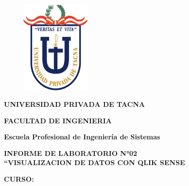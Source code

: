 \documentclass[12pt,letterpaper]{article}
\begin{document}
    \begin{titlepage}
        \begin{center}
            \begin{figure}[htb]
                \begin{center}
                    \includegraphics[width=3.5cm]{./img/logo}
                \end{center}
            \end{figure}
            \vspace*{0.15in}
            \begin{Large}
                \textbf{UNIVERSIDAD PRIVADA DE TACNA}\\
            \end{Large}
            \vspace*{0.15in}
            \begin{Large}
                \textbf{FACULTAD DE INGENIERIA} \\
            \end{Large}
            \vspace*{0.1in}
            \begin{Large}
                \textbf{Escuela Profesional de Ingeniería de Sistemas} \\
            \end{Large}
            \vspace*{0.3in}
            \begin{Large}
                \textbf{INFORME DE LABORATORIO N°02}\\
                \textbf{“VISUALIZACION DE DATOS CON QLIK SENSE}\\
            \end{Large}
            \vspace*{0.2in}
            \begin{Large}
                \textbf{CURSO:} \\
            \end{Large}
            \vspace*{0.1in}
            \begin{large}

\end{large}
\end{center}
\end{titlepage}
\end{document}

